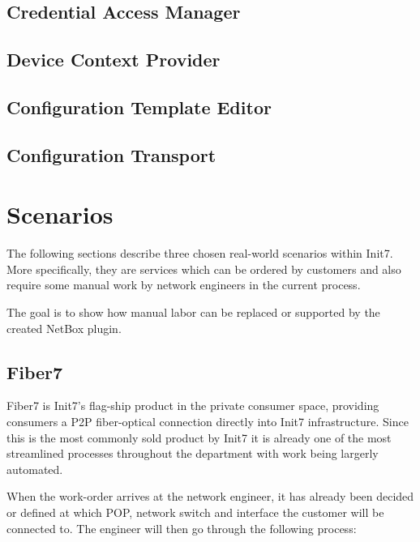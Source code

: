 \subsection{Credential Access Manager}



\subsection{Device Context Provider}

\subsection{Configuration Template Editor}

\subsection{Configuration Transport}



\section{Scenarios}

The following sections describe three chosen real-world scenarios within Init7.
More specifically, they are services which can be ordered by customers and also
require some manual work by network engineers in the current process.

The goal is to show how manual labor can be replaced or supported by the
created NetBox plugin.

\subsection{Fiber7}

Fiber7 is Init7's flag-ship product in the private consumer space,
providing consumers a \acrshort{P2P} fiber-optical connection directly into
Init7 infrastructure. Since this is the most commonly sold product by Init7
it is already one of the most streamlined processes throughout the department
with work being largerly automated.

When the work-order arrives at the network engineer, it has already been decided
or defined at which \acrshort{POP}, network switch and interface the customer
will be connected to. The engineer will then go through the following process:


